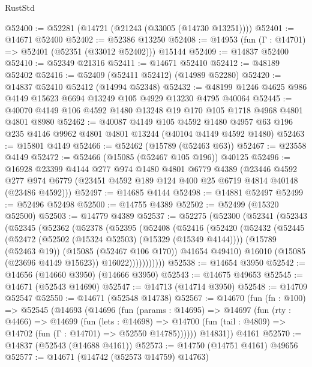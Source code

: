 \begin{lexlean}{RustStd}
\begin{coremodule}
@52400 := @52281 (@14721 (@21243 (@33005 (@14730 @13251))))
@52401 := @14671 @52400
@52402 := @52386 @13250
@52408 := @14953 (fun (Γ : @14701) => @52401 (@52351 (@33012 @52402))) @15144
@52409 := @14837 @52400
@52410 := @52349 @21316
@52411 := @14671 @52410
@52412 := @48189 @52402
@52416 := @52409 (@52411 @52412) (@14989 @52280)
@52420 := @14837 @52410 @52412 (@14994 @52348)
@52432 := @48199 @1246 @4625 @986 @4149 @15623 @6694 @13249 @105 @4929 @13230 @4795 @40064
@52445 := @40070 @4149 @106 @4592 @1480 @13248 @19 @170 @105 @1718 @4968 @4801 @4801 @8980
@52462 := @40087
    @4149
    @105
    @4592
    @1480
    @4957
    @63
    @196
    @235
    @4146
    @9962
    @4801
    @4801
    @13244
    (@40104 @4149 @4592 @1480)
@52463 := @15801 @4149
@52466 := @52462 (@15789 (@52463 @63))
@52467 := @23558 @4149
@52472 := @52466 (@15085 (@52467 @105 @196)) @40125
@52496 := @16928
    @23399
    @4144
    @277
    @974
    @1480
    @4801
    @6779
    @4389
    (@23446
      @4592
      @277
      @974
      @6779
      (@23451 @4592 @189 @124 @400 @25 @6719 @4814 @40148 (@23486 @4592)))
@52497 := @14685 @4144
@52498 := @14881 @52497
@52499 := @52496 @52498
@52500 := @14755 @4389
@52502 := @52499 (@15320 @52500)
@52503 := @14779 @4389
@52537 := @52275
    (@52300
      (@52341
        (@52343
          (@52345
            (@52362
              (@52378
                (@52395
                  (@52408
                    (@52416
                      (@52420
                        (@52432
                          (@52445
                            (@52472 (@52502 (@15324 @52503) (@15329 (@15349 @4144))))
                            (@15789 (@52463 @19))
                            (@15085 (@52467 @106 @170))
                            @41654
                            @49410)
                          @16010
                          (@15085 (@23696 @4149 @15623))
                          @16022)))))))))))
@52538 := @14654 @3950
@52542 := @14656 (@14660 @3950) (@14666 @3950)
@52543 := @14675 @49653
@52545 := @14671 (@52543 @14690)
@52547 := @14713 (@14714 @3950)
@52548 := @14709 @52547
@52550 := @14671 (@52548 @14738)
@52567 := @14670
    (fun (fn : @100) =>
    @52545
      (@14693
        (@14696
          (fun (params : @14695) =>
          @14697
            (fun (rty : @4466) =>
            @14699
              (fun (lets : @14698) =>
              @14700 (fun (tail : @4809) => @14702 (fun (Γ : @14701) => @52550 @14785))))))
        @14831))
    @4161
@52570 := @14837 (@52543 (@14688 @4161))
@52573 := @14750 (@14751 @4161) @49656
@52577 := @14671 (@14742 (@52573 @14759) @14763)

\end{coremodule}
\end{lexlean}
